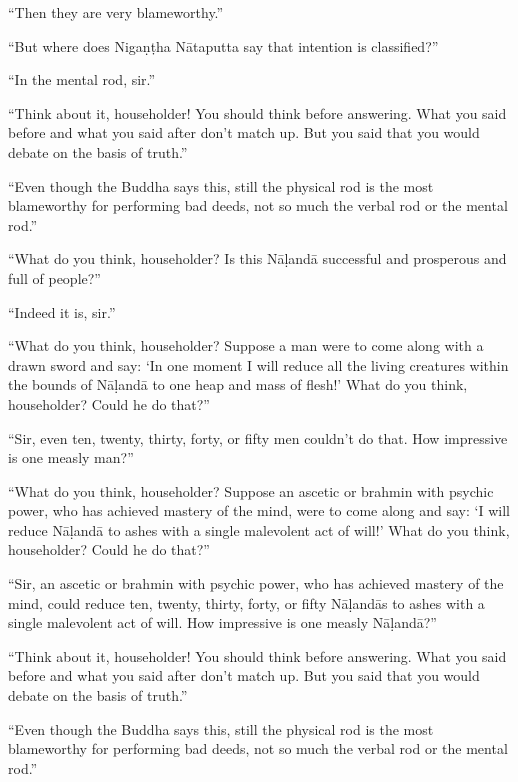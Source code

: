 \documentclass[12pt,openany]{book}%
\begin{document}
“Then they are very blameworthy.” 

“But where does \textsanskrit{Nigaṇṭha} \textsanskrit{Nātaputta} say that intention is classified?” 

“In the mental rod, sir.” 

“Think about it, householder! You should think before answering. What you said before and what you said after don’t match up. But you said that you would debate on the basis of truth.” 

“Even though the Buddha says this, still the physical rod is the most blameworthy for performing bad deeds, not so much the verbal rod or the mental rod.” 

“What do you think, householder? Is this \textsanskrit{Nāḷandā} successful and prosperous and full of people?” 

“Indeed it is, sir.” 

“What do you think, householder? Suppose a man were to come along with a drawn sword and say: ‘In one moment I will reduce all the living creatures within the bounds of \textsanskrit{Nāḷandā} to one heap and mass of flesh!’ What do you think, householder? Could he do that?” 

“Sir, even ten, twenty, thirty, forty, or fifty men couldn’t do that. How impressive is one measly man?” 

“What do you think, householder? Suppose an ascetic or brahmin with psychic power, who has achieved mastery of the mind, were to come along and say: ‘I will reduce \textsanskrit{Nāḷandā} to ashes with a single malevolent act of will!’ What do you think, householder? Could he do that?” 

“Sir, an ascetic or brahmin with psychic power, who has achieved mastery of the mind, could reduce ten, twenty, thirty, forty, or fifty \textsanskrit{Nāḷandās} to ashes with a single malevolent act of will. How impressive is one measly \textsanskrit{Nāḷandā}?” 

“Think about it, householder! You should think before answering. What you said before and what you said after don’t match up. But you said that you would debate on the basis of truth.” 

“Even though the Buddha says this, still the physical rod is the most blameworthy for performing bad deeds, not so much the verbal rod or the mental rod.” 
\end{document}
